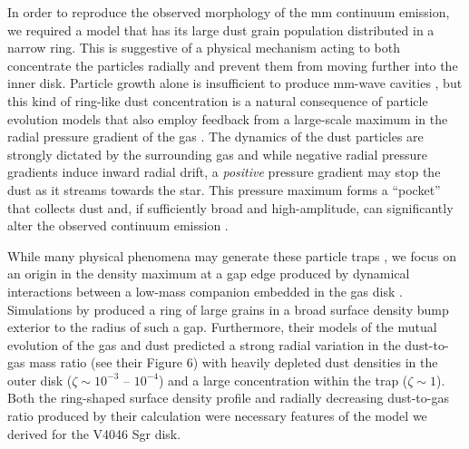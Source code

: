 {In order to reproduce the observed morphology of the mm continuum emission, we 
required a model that has its large dust grain population distributed in a 
narrow ring.  This is suggestive of a physical mechanism acting to both
concentrate the particles radially and prevent them from moving further into 
the inner disk.  Particle growth alone is insufficient to produce mm-wave 
cavities \citep{birnstiel12b}, but this kind of ring-like dust concentration is 
a natural consequence of particle evolution models that also employ feedback 
from a large-scale maximum in the radial pressure gradient of the gas 
\citep{pinilla12a}.  The dynamics of the dust particles are strongly dictated by
the surrounding gas and while negative radial pressure gradients induce inward 
radial drift, a {\it positive} pressure gradient may stop the dust as it streams
towards the star.  This pressure maximum forms a ``pocket'' that collects dust 
and, if sufficiently broad and high-amplitude, can significantly alter the 
observed continuum emission \citep{pinilla12b}.

While many physical phenomena may generate these particle traps 
\citep[e.g.][]{barge95,klahr97,alexander07,johansen09}, we focus on an origin in
the density maximum at a gap edge produced by dynamical interactions between a 
low-mass companion embedded in the gas disk \citep{lin79,goldreich80,crida06}.  
Simulations by \citet{pinilla12a} produced a ring of large grains in a broad 
surface density bump exterior to the radius of such a gap.  Furthermore, their 
models of the mutual evolution of the gas and dust predicted a strong radial 
variation in the dust-to-gas mass ratio (see their Figure 6) with heavily 
depleted dust densities in the outer disk ($\zeta \sim 10^{-3}$ -- $10^{-4}$) 
and a large concentration within the trap ($\zeta \sim 1$).  Both the 
ring-shaped surface density profile and radially decreasing dust-to-gas ratio 
produced by their calculation were necessary features of the model we derived 
for the V4046 Sgr disk.  

}
